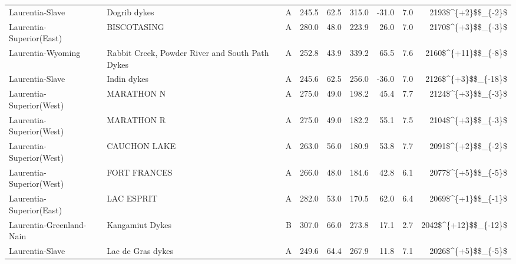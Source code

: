 \begin{longtable}{p{1 in}p{1 in}rrrrrrr}
               Laurentia-Slave &                                       Dogrib dykes &      A &     245.5 &      62.5 & 315.0 & -31.0 &       7.0 &     2193\$\textasciicircum \{+2\}\$\$\_\{-2\}\$ \\
      Laurentia-Superior(East) &                                        BISCOTASING &      A &     280.0 &      48.0 & 223.9 &  26.0 &       7.0 &     2170\$\textasciicircum \{+3\}\$\$\_\{-3\}\$ \\
             Laurentia-Wyoming &    Rabbit Creek, Powder River and South Path Dykes &      A &     252.8 &      43.9 & 339.2 &  65.5 &       7.6 &    2160\$\textasciicircum \{+11\}\$\$\_\{-8\}\$ \\
               Laurentia-Slave &                                        Indin dykes &      A &     245.6 &      62.5 & 256.0 & -36.0 &       7.0 &    2126\$\textasciicircum \{+3\}\$\$\_\{-18\}\$ \\
      Laurentia-Superior(West) &                                         MARATHON N &      A &     275.0 &      49.0 & 198.2 &  45.4 &       7.7 &     2124\$\textasciicircum \{+3\}\$\$\_\{-3\}\$ \\
      Laurentia-Superior(West) &                                         MARATHON R &      A &     275.0 &      49.0 & 182.2 &  55.1 &       7.5 &     2104\$\textasciicircum \{+3\}\$\$\_\{-3\}\$ \\
      Laurentia-Superior(West) &                                       CAUCHON LAKE &      A &     263.0 &      56.0 & 180.9 &  53.8 &       7.7 &     2091\$\textasciicircum \{+2\}\$\$\_\{-2\}\$ \\
      Laurentia-Superior(West) &                                       FORT FRANCES &      A &     266.0 &      48.0 & 184.6 &  42.8 &       6.1 &     2077\$\textasciicircum \{+5\}\$\$\_\{-5\}\$ \\
      Laurentia-Superior(East) &                                         LAC ESPRIT &      A &     282.0 &      53.0 & 170.5 &  62.0 &       6.4 &     2069\$\textasciicircum \{+1\}\$\$\_\{-1\}\$ \\
      Laurentia-Greenland-Nain &                                    Kangamiut Dykes &      B &     307.0 &      66.0 & 273.8 &  17.1 &       2.7 &   2042\$\textasciicircum \{+12\}\$\$\_\{-12\}\$ \\
               Laurentia-Slave &                                  Lac de Gras dykes &      A &     249.6 &      64.4 & 267.9 &  11.8 &       7.1 &     2026\$\textasciicircum \{+5\}\$\$\_\{-5\}\$ \\

\end{longtable}
